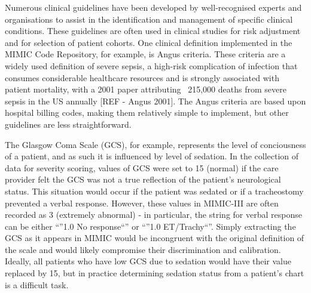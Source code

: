 \documentclass{elsart}
\begin{document}



Numerous clinical guidelines have been developed by well-recognised experts and organisations to assist in the identification and management of specific clinical conditions. These guidelines are often used in clinical studies for risk adjustment and for selection of patient cohorts. One clinical definition implemented in the MIMIC Code Repository, for example, is Angus criteria. These criteria are a widely used definition of severe sepsis, a high-risk complication of infection that consumes considerable healthcare resources and is strongly associated with patient mortality, with a 2001 paper attributing ~215,000 deaths from severe sepsis in the US annually [REF - Angus 2001]. The Angus criteria are based upon hospital billing codes, making them relatively simple to implement, but other guidelines are less straightforward.

The Glasgow Coma Scale (GCS), for example, represents the level of conciousness of a patient, and as such it is influenced by level of sedation. In the collection of data for severity scoring, values of GCS were set to 15 (normal) if the care provider felt the GCS was not a true reflection of the patient's neurological status. This situation would occur if the patient was sedated or if a tracheostomy prevented a verbal response. However, these values in MIMIC-III are often recorded as 3 (extremely abnormal) - in particular, the string for verbal response can be either ``''1.0 No response``'' or ``''1.0 ET/Trachy``''. Simply extracting the GCS as it appears in MIMIC would be incongruent with the original definition of the scale and would likely compromise their discrimination and calibration. Ideally, all patients who have low GCS due to sedation would have their value replaced by 15, but in practice determining sedation status from a patient's chart is a difficult task.
\end{document}
